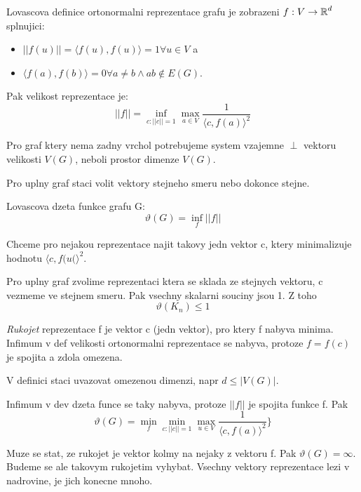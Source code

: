 \begin{definition}
	Lovascova definice ortonormalni reprezentace grafu je zobrazeni $f:V \to \operatorname{\mathbb{R}}^d$ splnujici:
	\begin{itemize}
		\item $|| f(u) || = \langle f(u), f(u) \rangle = 1 \forall u \in V$ a
		\item $\langle f(a), f(b) \rangle = 0 \forall a \ne b \land ab \notin E(G)$.
	\end{itemize}

	Pak velikost reprezentace je:
	\[ || f || = \inf_{c: ||c|| = 1} \max_{a \in V} \frac{1}{\langle c, f(a) \rangle^2} \]
\end{definition}

\begin{example}
	Pro graf ktery nema zadny vrchol potrebujeme system vzajemne $\perp$ vektoru velikosti $V(G)$, neboli prostor dimenze $V(G)$.

	Pro uplny graf staci volit vektory stejneho smeru nebo dokonce stejne.
\end{example}

\begin{definition}
	Lovascova dzeta funkce grafu G:
	\[ \vartheta(G) = \inf_f || f || \]

	Chceme pro nejakou reprezentace najit takovy jedn vektor c, ktery minimalizuje hodnotu $\langle c, f(u( \rangle^2$.
\end{definition}

\begin{example}
	Pro uplny graf zvolime reprezentaci ktera se sklada ze stejnych vektoru, c vezmeme ve stejnem smeru.
	Pak vsechny skalarni souciny jsou 1. Z toho
	\[ \vartheta(K_n) \leq 1 \]
\end{example}

\begin{definition}
	\emph{Rukojet} reprezentace f je vektor c (jedn vektor), pro ktery f nabyva minima.
	Infimum v def velikosti ortonormalni reprezentace se nabyva, protoze $f = f(c)$ je spojita a zdola omezena.

	V definici staci uvazovat omezenou dimenzi, napr $d \leq |V(G)|$.

	Infimum v dev dzeta funce se taky nabyva, protoze $||f||$ je spojita funkce f. Pak
	\[ \vartheta(G) = \min_f \min_{c: ||c|| = 1} \max_{u \in V} \frac{1}{\langle c, f(a) \rangle^2} \} \]
\end{definition}
\begin{agreement}
	Muze se stat, ze rukojet je vektor kolmy na nejaky z vektoru f. Pak $\vartheta(G) = \infty$.
	Budeme se ale takovym rukojetim vyhybat. Vsechny vektory reprezentace lezi v nadrovine, je jich konecne mnoho.
\end{agreement}

